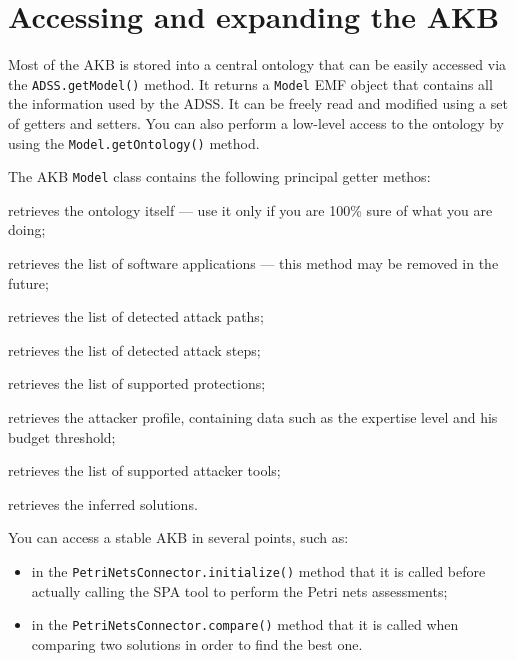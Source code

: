 \documentclass{memoir}
\newcommand{\Method}[1]{\texttt{#1}}
\newcommand{\Class}[1]{\texttt{#1}}
\begin{document}
	\chapter{Accessing and expanding the AKB}
	
	Most of the AKB is stored into a central ontology that can be easily accessed via the \Method{ADSS.getModel()} method. It returns a \Class{Model} EMF object that contains all the information used by the ADSS. It can be freely read and modified using a set of getters and setters. You can also perform a low-level access to the ontology by using the \Method{Model.getOntology()} method.
	
	The AKB \Class{Model} class contains the following principal getter methos:
	
	\begin{description}[style = nextline, before=\normalfont, font = \normalfont\ttfamily]
		\item[getOntology()] retrieves the ontology itself --- use it only if you are 100\% sure of what you are doing;
		\item[getApplications()] retrieves the list of software applications --- this method may be removed in the future;
		\item[getAttackPaths()] retrieves the list of detected attack paths;
		\item[getAttackSteps()] retrieves the list of detected attack steps;
		\item[getProtections()] retrieves the list of supported protections;
		\item[getAttacker()] retrieves the attacker profile, containing data such as the expertise level and his budget threshold;
		\item[getAttackerTools()] retrieves the list of supported attacker tools;
		\item[getSolutions()] retrieves the inferred solutions.
	\end{description}

	You can access a stable AKB in several points, such as:
	
	\begin{itemize}
		\item in the \Method{PetriNetsConnector.initialize()} method that it is called before actually calling the SPA tool to perform the Petri nets assessments;
		\item in the \Method{PetriNetsConnector.compare()} method that it is called when comparing two solutions in order to find the best one.
	\end{itemize}
	
\end{document}
